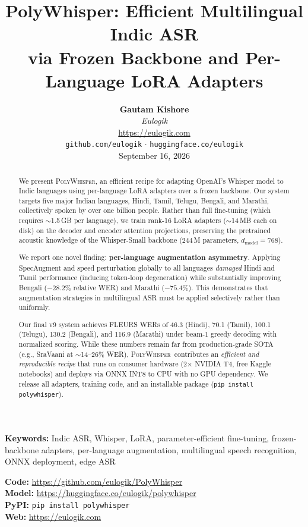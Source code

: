 \documentclass[11pt,a4paper]{article}
\title{PolyWhisper: Efficient Multilingual Indic ASR\\ via Frozen Backbone and Per-Language LoRA Adapters}
\author{
  \textbf{Gautam Kishore}\\[0.5em]
  \textit{Eulogik}\\[0.3em]
  \url{https://eulogik.com}\\[0.3em]
  \texttt{github.com/eulogik} $\cdot$ \texttt{huggingface.co/eulogik}\\[0.5em]
  September 16, 2026
}
\date{}
\newcommand{\poly}{\textsc{PolyWhisper}}
\begin{document}
\maketitle

\begin{abstract}
\noindent
We present \poly, an efficient recipe for adapting OpenAI's Whisper model to Indic languages using per-language LoRA adapters over a frozen backbone.
Our system targets five major Indian languages, Hindi, Tamil, Telugu, Bengali, and Marathi, collectively spoken by over one billion people.
Rather than full fine-tuning (which requires $\sim$1.5\,GB per language), we train rank-16 LoRA adapters ($\sim$14\,MB each on disk) on the decoder and encoder attention projections, preserving the pretrained acoustic knowledge of the Whisper-Small backbone (244\,M parameters, $d_{\text{model}}{=}768$).

We report one novel finding: \textbf{per-language augmentation asymmetry}.
Applying SpecAugment and speed perturbation globally to all languages \emph{damaged} Hindi and Tamil performance (inducing token-loop degeneration) while substantially improving Bengali ($-28.2\%$ relative WER) and Marathi ($-75.4\%$).
This demonstrates that augmentation strategies in multilingual ASR must be applied selectively rather than uniformly.

Our final v9 system achieves FLEURS WERs of 46.3 (Hindi), 70.1 (Tamil), 100.1 (Telugu), 130.2 (Bengali), and 116.9 (Marathi) under beam-$1$ greedy decoding with normalized scoring.
While these numbers remain far from production-grade SOTA (e.g., SraVaani at $\sim$14--26\% WER), \poly\ contributes an \emph{efficient and reproducible recipe} that runs on consumer hardware (2$\times$ NVIDIA T4, free Kaggle notebooks) and deploys via ONNX INT8 to CPU with no GPU dependency.
We release all adapters, training code, and an installable package (\texttt{pip install polywhisper}).
\end{abstract}

\noindent\textbf{Keywords:} Indic ASR, Whisper, LoRA, parameter-efficient fine-tuning, frozen-backbone adapters, per-language augmentation, multilingual speech recognition, ONNX deployment, edge ASR

\vspace{0.5em}
\noindent\small
\textbf{Code:} \url{https://github.com/eulogik/PolyWhisper}\\
\textbf{Model:} \url{https://huggingface.co/eulogik/polywhisper}\\
\textbf{PyPI:} \texttt{pip install polywhisper}\\
\textbf{Web:} \url{https://eulogik.com}
\vspace{0.5em}
\end{document}
